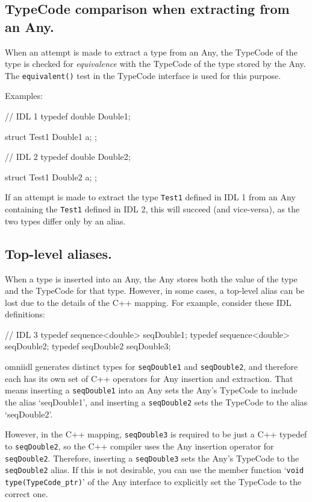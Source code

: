 \documentclass[11pt,twoside,a4paper]{book}
\newcommand{\type}[1]{\texttt{#1}}
\newcommand{\code}[1]{\texttt{#1}}
\newcommand{\op}[1]{\texttt{#1()}}
\begin{document}
\subsection{TypeCode comparison when extracting from an Any.}
When an attempt is made to extract a type from an Any, the TypeCode of
the type is checked for \emph{equivalence} with the TypeCode of the
type stored by the Any. The \op{equivalent} test in the TypeCode
interface is used for this purpose.

Examples:

\begin{idllisting}
// IDL 1
typedef double Double1;

struct Test1 {
  Double1 a;
};
\end{idllisting}

\begin{idllisting}
// IDL 2
typedef double Double2;

struct Test1 {
  Double2 a;
};
\end{idllisting}
    
If an attempt is made to extract the type \type{Test1} defined in IDL
1 from an Any containing the \type{Test1} defined in IDL 2, this will
succeed (and vice-versa), as the two types differ only by an alias.

\subsection{Top-level aliases.}
When a type is inserted into an Any, the Any stores both the value of
the type and the TypeCode for that type. However, in some cases, a
top-level alias can be lost due to the details of the C++ mapping. For
example, consider these IDL definitions:

\begin{idllisting}
// IDL 3
typedef sequence<double> seqDouble1;
typedef sequence<double> seqDouble2;
typedef seqDouble2       seqDouble3;
\end{idllisting}

omniidl generates distinct types for \type{seqDouble1} and
\type{seqDouble2}, and therefore each has its own set of C++ operators
for Any insertion and extraction. That means inserting a
\type{seqDouble1} into an Any sets the Any's TypeCode to include the
alias `seqDouble1', and inserting a \type{seqDouble2} sets the
TypeCode to the alias `seqDouble2'.

However, in the C++ mapping, \type{seqDouble3} is required to be just
a C++ typedef to \type{seqDouble2}, so the C++ compiler uses the Any
insertion operator for \type{seqDouble2}. Therefore, inserting a
\type{seqDouble3} sets the Any's TypeCode to the \type{seqDouble2}
alias. If this is not desirable, you can use the member function
`\code{void type(TypeCode\_ptr)}' of the Any interface to explicitly
set the TypeCode to the correct one.
\end{document}
